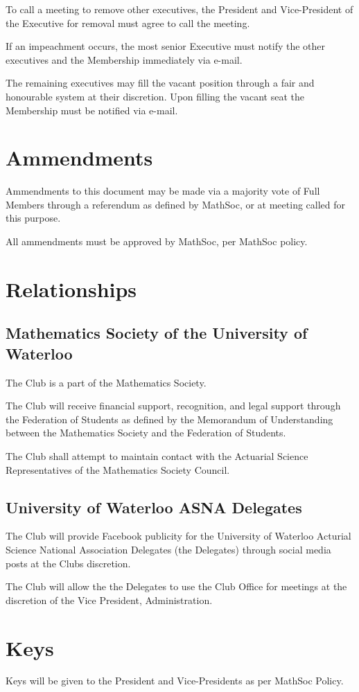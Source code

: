 \documentclass[11pt]{mathsoc}
\begin{document}
To call a meeting to remove other executives, the President and Vice-President
of the Executive for removal must agree to call the meeting.

If an impeachment occurs, the most senior Executive must notify the other 
executives and the Membership immediately via e-mail. 

The remaining executives may fill the vacant position through a fair and 
honourable system at their discretion. Upon filling the vacant seat the 
Membership must be notified via e-mail.

\section{Ammendments}
Ammendments to this document may be made via a majority vote of Full Members 
through a referendum as defined by MathSoc, or at meeting called for this purpose.  

All ammendments must be approved by MathSoc, per MathSoc policy.

\section{Relationships}

\subsection{Mathematics Society of the University of Waterloo}
The Club is a part of the Mathematics Society.

The Club will receive financial support, recognition, and legal 
support through the Federation of Students as defined by the Memorandum of 
Understanding between the Mathematics Society and the Federation of Students.

The Club shall attempt to maintain contact with the Actuarial Science 
Representatives of the Mathematics Society Council.

\subsection{University of Waterloo ASNA Delegates}
The Club will provide Facebook publicity for the University of Waterloo
Acturial Science National Association Delegates (the Delegates) through social media posts
at the Clubs discretion.

The Club will allow the the Delegates to use the Club Office for meetings at the discretion
of the Vice President, Administration.

\section{Keys}
Keys will be given to the President and Vice-Presidents as per MathSoc Policy.
\end{document}
